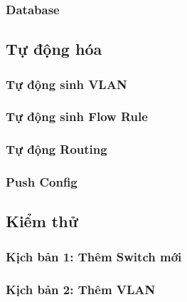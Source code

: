 \subsubsection{Database}

\subsection{Tự động hóa}

\subsubsection{Tự động sinh VLAN}

\subsubsection{Tự động sinh Flow Rule}

\subsubsection{Tự động Routing}

\subsubsection{Push Config}

\subsection{Kiểm thử}

\subsubsection{Kịch bản 1: Thêm Switch mới}

\subsubsection{Kịch bản 2: Thêm VLAN}

